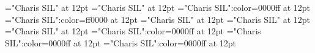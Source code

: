 \documentclass[a4paper]{article}
\begin{document}
\pagestyle{plain}
\sloppy
\setlength{\parfillskip}{0pt plus 1fil}
\font\sectionletter="Charis SIL" at 12pt
\font\articlesectionletter="Charis SIL" at 12pt
\font\sensearticlesectionletter="Charis SIL":color=0000ff at 12pt
\font\sensebeforearticlesectionletter="Charis SIL":color=ff0000 at 12pt
\font\firstoftypeheadwordlastoftypesectionletter="Charis SIL" at 12pt
\font\firstoftypelastoftypepronunciationarticlesectionletter="Charis SIL" at 12pt
\font\firstoftypelastoftypestressfirstoftypelastoftypepronunciationarticlesectionletter="Charis SIL" at 12pt
\font\firstoftypegrammarcategorylastoftypesensearticlesectionletter="Charis SIL":color=0000ff at 12pt
\font\exampleusefirstoftypelastoftypesensearticlesectionletter="Charis SIL":color=0000ff at 12pt
\font\examplesensearticlesectionletter="Charis SIL":color=0000ff at 12pt

\pagestyle{fancy} 

\end{document}
